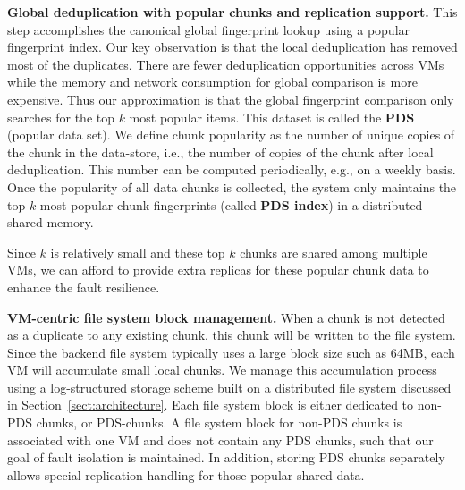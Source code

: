 \textbf{Global deduplication with popular chunks and replication support.}
This step accomplishes the canonical global fingerprint lookup using a popular fingerprint index.
Our key observation is that the local deduplication has removed most of the duplicates.
There are fewer deduplication opportunities across VMs while the memory and network
consumption for global comparison is more expensive.
Thus our approximation is that the global fingerprint comparison only searches for the top $k$
most popular items. This dataset is called the \textbf{PDS} (popular data set). 
We define chunk popularity as the number of unique copies of the chunk in the data-store,
i.e., the number of copies of the chunk after local deduplication.
This number can be computed periodically, e.g., on a weekly basis.
Once the popularity of all data chunks is collected, the system only maintains the top $k$
most popular chunk fingerprints (called \textbf{PDS index}) in a distributed shared memory.  

Since $k$ is relatively small and these top $k$ chunks are shared among multiple VMs, 
we can afford to provide extra replicas for these popular chunk data to enhance the fault resilience.

\textbf{VM-centric file system block management.}
When a chunk is not detected as a duplicate to any existing chunk, this chunk will be written
to the file system. Since the backend file system typically uses a large block size such as 64MB, each VM will 
accumulate small local chunks. We manage this accumulation process using a log-structured storage scheme built
on a distributed file system discussed in Section~\ref{sect:architecture}.
Each file system block is either dedicated to non-PDS chunks, or PDS-chunks.
A file system block for non-PDS chunks is associated with one VM and does not contain
any PDS chunks, such that our goal of fault isolation is maintained.
In addition, storing PDS chunks separately allows special replication handling for those popular shared data. 


